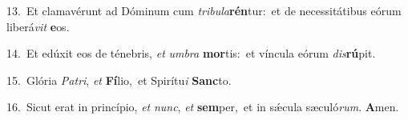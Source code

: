 {\numbfont\textcolor{\numbcolor}{13.}}~Et clamavérunt ad Dóminum cum \textit{tri}\-\textit{bu}\textit{la}\textbf{rén}tur:~\star et de necessitátibus eórum liberá\textit{vit} \textbf{e}\-os.\par
{\numbfont\textcolor{\numbcolor}{14.}}~Et edúxit eos de ténebris, \textit{et} \textit{um}\-\textit{bra} \textbf{mor}\-tis:~\star et víncula eórum \textit{dis}\-\textbf{rú}pit.\par
{\numbfont\textcolor{\numbcolor}{15.}}~Glória \textit{Pa}\-\textit{tri}, \textit{et} \textbf{Fí}\-lio,~\star et Spirítu\textit{i} \textbf{Sanc}\-to.\par
{\numbfont\textcolor{\numbcolor}{16.}}~Sicut erat in princípio, \textit{et} \textit{nunc}\-, \textit{et} \textbf{sem}\-per,~\star et in sǽcula sæculó\-\textit{rum}\-. \textbf{A}\-men.\par
